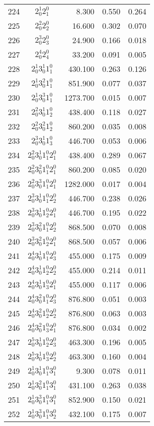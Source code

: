 \documentclass[12pt]{article}
\begin{document}
\begin{table}
\begin{tabular}{rcrrr}
224&$2_0^1 2_1^0$& 8.300& 0.550& 0.264\\
225&$2_0^2 2_2^0$& 16.600& 0.302& 0.070\\
226&$2_0^3 2_3^0$& 24.900& 0.166& 0.018\\
227&$2_0^4 2_4^0$& 33.200& 0.091& 0.005\\
228&$2_0^1 3_0^1 1_1^0$& 430.100& 0.263& 0.126\\
229&$2_0^1 3_0^2 1_1^0$& 851.900& 0.077& 0.037\\
230&$2_0^1 3_0^3 1_1^0$& 1273.700& 0.015& 0.007\\
231&$2_0^2 3_0^1 1_2^0$& 438.400& 0.118& 0.027\\
232&$2_0^2 3_0^2 1_2^0$& 860.200& 0.035& 0.008\\
233&$2_0^3 3_0^1 1_3^0$& 446.700& 0.053& 0.006\\
234&$2_0^2 3_0^1 1_1^0 2_1^0$& 438.400& 0.289& 0.067\\
235&$2_0^2 3_0^2 1_1^0 2_1^0$& 860.200& 0.085& 0.020\\
236&$2_0^2 3_0^3 1_1^0 2_1^0$& 1282.000& 0.017& 0.004\\
237&$2_0^3 3_0^1 1_1^0 2_2^0$& 446.700& 0.238& 0.026\\
238&$2_0^3 3_0^1 1_2^0 2_1^0$& 446.700& 0.195& 0.022\\
239&$2_0^3 3_0^2 1_1^0 2_2^0$& 868.500& 0.070& 0.008\\
240&$2_0^3 3_0^2 1_2^0 2_1^0$& 868.500& 0.057& 0.006\\
241&$2_0^4 3_0^1 1_1^0 2_3^0$& 455.000& 0.175& 0.009\\
242&$2_0^4 3_0^1 1_2^0 2_2^0$& 455.000& 0.214& 0.011\\
243&$2_0^4 3_0^1 1_3^0 2_1^0$& 455.000& 0.117& 0.006\\
244&$2_0^4 3_0^2 1_1^0 2_3^0$& 876.800& 0.051& 0.003\\
245&$2_0^4 3_0^2 1_2^0 2_2^0$& 876.800& 0.063& 0.003\\
246&$2_0^4 3_0^2 1_3^0 2_1^0$& 876.800& 0.034& 0.002\\
247&$2_0^5 3_0^1 1_2^0 2_3^0$& 463.300& 0.196& 0.005\\
248&$2_0^5 3_0^1 1_3^0 2_2^0$& 463.300& 0.160& 0.004\\
249&$2_0^1 3_0^1 1_1^0 3_1^0$& 9.300& 0.078& 0.011\\
250&$2_0^1 3_0^2 1_1^0 3_1^0$& 431.100& 0.263& 0.038\\
251&$2_0^1 3_0^3 1_1^0 3_1^0$& 852.900& 0.150& 0.021\\
252&$2_0^1 3_0^3 1_1^0 3_2^0$& 432.100& 0.175& 0.007\\

\end{tabular}
\end{table}
\end{document}
